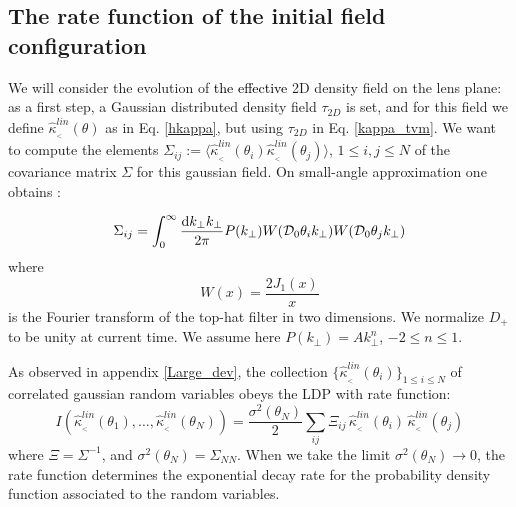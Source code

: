 \documentclass[twocolumn,aps,reprint, nofootinbib]{revtex4}
\newcommand{\dd}{{\rm d}}
\newcommand{\hkappa}{\hat{\kappa}_{_<}}
\newcommand{\mD}{{\mathcal{D}_0}}
\newcommand{\fb}[1]{{\textcolor{red}{#1}}}
\newcommand{\pr}[1]{{\textcolor{black}{\textit{} #1}}}
\begin{document}
\subsection{The rate function of the initial field configuration}

We will consider the evolution of \pr{the effective} 2D density field on the lens plane: as a first step, a Gaussian distributed density field $\tau_{2D}$ is set, and for this field we define $\hkappa^{lin}(\theta)$ as in Eq. \eqref{hkappa}, but using $\tau_{2D}$ in Eq. \eqref{kappa_tvm}. We want to compute the elements $\Sigma_{ij} := \langle \hkappa^{lin}(\theta_i) \hkappa^{lin}(\theta_j) \rangle$, $1 \leq i, j \leq N$ of the covariance matrix $\Sigma$ for this gaussian field. On small-angle approximation one obtains \cite{Bernardeau:1994hn}:

\begin{equation}
\label{Sigma}
\Sigma_{ij} =  \int_0^\infty \frac{\dd k_\perp k_\perp}{2 \pi} P(k_\perp) W(\mD \theta_i k_\perp) W(\mD \theta_j k_\perp)
\end{equation}
where 
\begin{equation}
W(x) = \frac{2 J_1(x)}{x}
\end{equation}
is the Fourier transform of the top-hat filter in two dimensions. We normalize $D_+$ to be unity at current time. We assume here $P(k_\perp) = A k_\perp^n$, $-2 \leq n \leq 1$.

As observed in appendix \ref{Large_dev}, the collection $\{\hkappa^{lin}(\theta_i)\}_{1 \leq i \leq N}$ of correlated gaussian random variables obeys the LDP with rate function:
\begin{equation}
\label{rate_func_I}
I(\hkappa^{lin} (\theta_1), \ldots, \hkappa^{lin} (\theta_N)) = \frac{\sigma^2(\theta_N)}{2} \sum_{i j} \Xi_{ij} \, \hkappa^{lin} (\theta_i) \,  \hkappa^{lin} (\theta_j)
\end{equation}
where $\Xi = \Sigma^{-1}$, and $\sigma^2(\theta_N) = \Sigma_{NN}$. When we take the limit $\sigma^2(\theta_N) \to 0$, the rate function determines the exponential decay rate for the probability density function associated to the random variables.

\end{document}
